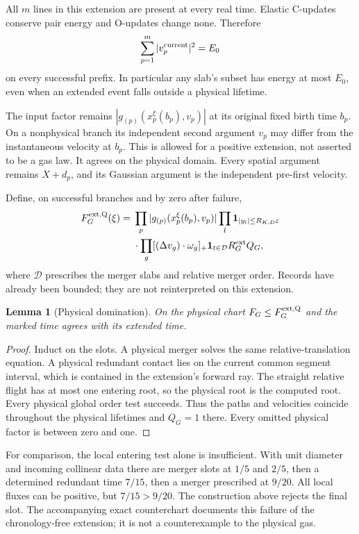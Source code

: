 \documentclass[11pt]{article}
\newcommand{\eps}{\varepsilon}
\newcommand{\ind}{\mathbf1}
\newtheorem{lemma}[theorem]{Lemma}
\theoremstyle{definition}\newtheorem{definition}[theorem]{Definition}
\theoremstyle{remark}\newtheorem{remark}[theorem]{Remark}
\numberwithin{equation}{section}
\begin{document}
All $m$ lines in this extension are present at every real time. Elastic
C-updates conserve pair energy and O-updates change none. Therefore
\begin{equation}\label{eq:all-energy}
 \sum_{p=1}^m|v_p^{\rm current}|^2=E_0
\end{equation}
on every successful prefix. In particular any slab's subset has energy at
most $E_0$, even when an extended event falls outside a physical lifetime.

The input factor remains
$|g_{(p)}(x_p^\xi(b_p),v_p)|$ at its original fixed birth time $b_p$.
On a nonphysical branch its independent second argument $v_p$ may differ
from the instantaneous velocity at $b_p$. This is allowed for a positive
extension, not asserted to be a gas law. It agrees on the physical domain.
Every spatial argument remains $X+d_p$, and its Gaussian argument is the
independent pre-first velocity.

Define, on successful branches and by zero after failure,
\begin{align}
 F_G^{\rm ext,Q}(\xi)
 ={}&\prod_p|g_{(p)}(x_p^\xi(b_p),v_p)|
     \prod_l\ind_{|y_l|\le R_{K,D}\eps}\notag\\
 &\cdot\prod_g[(\Delta v_g)\cdot\omega_g]_+
      \ind_{t\in\mathcal D}R_G^{\rm ext}Q_G,
       \label{eq:extension}
\end{align}
where $\mathcal D$ prescribes the merger slabs and relative merger order.
Records have already been bounded; they are not reinterpreted on this
extension.

\begin{lemma}[Physical domination]\label{lem:domination}
On the physical chart $F_G\le F_G^{\rm ext,Q}$ and the marked time agrees
with its extended time.
\end{lemma}
\begin{proof}
Induct on the slots. A physical merger solves the same relative-translation
equation. A physical redundant contact lies on the current common segment
interval, which is contained in the extension's forward ray. The straight
relative flight has at most one entering root, so the physical root is the
computed root. Every physical global order test succeeds. Thus the paths and
velocities coincide throughout the physical lifetimes and $Q_G=1$ there.
Every omitted physical factor is between zero and one.
\end{proof}

For comparison, the local entering test alone is insufficient. With
unit diameter and incoming collinear data there are merger slots at $1/5$
and $2/5$, then a determined redundant time $7/15$, then a merger prescribed
at $9/20$. All local fluxes can be positive, but $7/15>9/20$.
The construction above rejects the final slot. The accompanying exact
counterchart documents this failure of the chronology-free extension; it is
not a counterexample to the physical gas.
\end{document}
